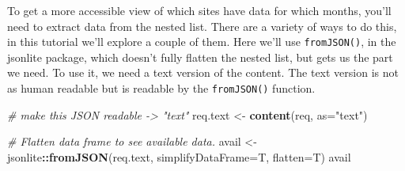 \documentclass[]{book}
\newenvironment{Shaded}{\begin{snugshade}}{\end{snugshade}}
\newcommand{\CommentTok}[1]{\textcolor[rgb]{0.56,0.35,0.01}{\textit{#1}}}
\newcommand{\DataTypeTok}[1]{\textcolor[rgb]{0.13,0.29,0.53}{#1}}
\newcommand{\KeywordTok}[1]{\textcolor[rgb]{0.13,0.29,0.53}{\textbf{#1}}}
\newcommand{\NormalTok}[1]{#1}
\newcommand{\OperatorTok}[1]{\textcolor[rgb]{0.81,0.36,0.00}{\textbf{#1}}}
\newcommand{\StringTok}[1]{\textcolor[rgb]{0.31,0.60,0.02}{#1}}
\begin{document}
To get a more accessible view of which sites have data for which months, you'll
need to extract data from the nested list. There are a variety of ways to do this,
in this tutorial we'll explore a couple of them. Here we'll use \texttt{fromJSON()}, in
the jsonlite package, which doesn't fully flatten the nested list, but gets us
the part we need. To use it, we need a text version of the content. The text
version is not as human readable but is readable by the \texttt{fromJSON()} function.

\begin{Shaded}
\begin{Highlighting}[]
\CommentTok{# make this JSON readable -> "text"}
\NormalTok{req.text <-}\StringTok{ }\KeywordTok{content}\NormalTok{(req, }\DataTypeTok{as=}\StringTok{"text"}\NormalTok{)}

\CommentTok{# Flatten data frame to see available data. }
\NormalTok{avail <-}\StringTok{ }\NormalTok{jsonlite}\OperatorTok{::}\KeywordTok{fromJSON}\NormalTok{(req.text, }\DataTypeTok{simplifyDataFrame=}\NormalTok{T, }\DataTypeTok{flatten=}\NormalTok{T)}
\NormalTok{avail}
\end{Highlighting}
\end{Shaded}
\end{document}
